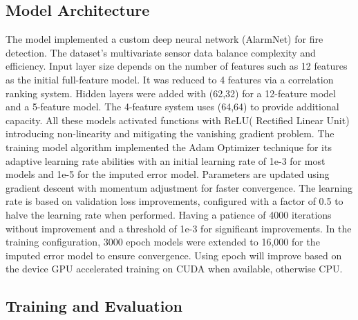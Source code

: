 \documentclass[conference]{IEEEtran}
\begin{document}
\subsection{\-Model Architecture}
The model implemented a custom deep neural network
(AlarmNet) for fire detection. The dataset's multivariate
sensor data balance complexity and efficiency. Input layer
size depends on the number of features such as 12 features
as the initial full-feature model. It was reduced to 4
features via a correlation ranking system. Hidden layers
were added with (62,32) for a 12-feature model and a
5-feature model. The 4-feature system uses (64,64) to
provide additional capacity. All these models activated
functions with ReLU( Rectified Linear Unit) introducing
non-linearity and mitigating the vanishing gradient problem.
The training model algorithm implemented the Adam Optimizer
technique for its adaptive learning rate abilities with an
initial learning rate of 1e-3 for most models and 1e-5 for
the imputed error model. Parameters are updated using
gradient descent with momentum adjustment for faster
convergence. The learning rate is based on validation loss
improvements, configured with a factor of 0.5 to halve the
learning rate when performed. Having a patience of 4000
iterations without improvement and a threshold of 1e-3 for
significant improvements. In the training configuration,
3000 epoch models were extended to 16,000 for the imputed
error model to ensure convergence. Using epoch will improve
based on the device GPU accelerated training on CUDA when
available, otherwise CPU. 




\subsection{Training and Evaluation}\label{SCM}
\end{document}
